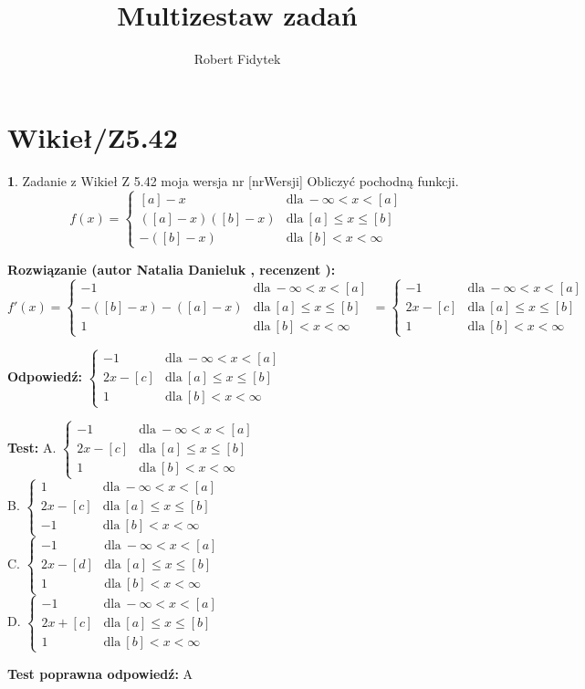 \documentclass[12pt, a4paper]{article}
\title{Multizestaw zadań}
\author{Robert Fidytek}
\date{}
\theoremstyle{definition} %
\newtheorem{zad}{}
\newcommand{\kategoria}[1]{\section{#1}} %
\newcommand{\zadStart}[1]{\begin{zad}#1\newline} %
\newcommand{\zadStop}{\end{zad}}   %
\newcommand{\rozwStart}[2]{\noindent \textbf{Rozwiązanie (autor #1 , recenzent #2): }\newline} %
\newcommand{\rozwStop}{\newline}                                            %
\newcommand{\odpStart}{\noindent \textbf{Odpowiedź:}\newline}    %
\newcommand{\odpStop}{\newline}                                             %
\newcommand{\testStart}{\noindent \textbf{Test:}\newline} %
\newcommand{\testStop}{\newline} %
\newcommand{\kluczStart}{\noindent \textbf{Test poprawna odpowiedź:}\newline} %
\newcommand{\kluczStop}{\newline} %
\begin{document}
\maketitle

\kategoria{Wikieł/Z5.42}

\zadStart{Zadanie z Wikieł Z 5.42 moja wersja nr [nrWersji]}
Obliczyć pochodną funkcji.
$$f(x) = 
\begin{cases} 
[a] - x & \text{dla} \ -\infty < x < [a] \\
([a] - x)([b] - x) & \text{dla} \ [a] \le x \le [b] \\
-([b] - x) & \text{dla} \ [b] < x < \infty
\end{cases} 
$$
\zadStop

\rozwStart{Natalia Danieluk}{}
$$f'(x) = 
\begin{cases} 
- 1 & \text{dla} \ -\infty < x < [a] \\
-([b] - x) - ([a] - x) & \text{dla} \ [a] \le x \le [b] \\
1 & \text{dla} \ [b] < x < \infty
\end{cases} 
=
\begin{cases} 
- 1 & \text{dla} \ -\infty < x < [a] \\
2x - [c] & \text{dla} \ [a] \le x \le [b] \\
1 & \text{dla} \ [b] < x < \infty
\end{cases} 
$$
\rozwStop

\odpStart
$
\begin{cases} 
- 1 & \text{dla} \ -\infty < x < [a] \\
2x - [c] & \text{dla} \ [a] \le x \le [b] \\
1 & \text{dla} \ [b] < x < \infty
\end{cases} 
$
\odpStop

\testStart
A. $
\begin{cases} 
- 1 & \text{dla} \ -\infty < x < [a] \\
2x - [c] & \text{dla} \ [a] \le x \le [b] \\
1 & \text{dla} \ [b] < x < \infty
\end{cases} 
$\\
B. $
\begin{cases} 
1 & \text{dla} \ -\infty < x < [a] \\
2x - [c] & \text{dla} \ [a] \le x \le [b] \\
-1 & \text{dla} \ [b] < x < \infty
\end{cases} 
$\\
C. $
\begin{cases} 
-1 & \text{dla} \ -\infty < x < [a] \\
2x - [d] & \text{dla} \ [a] \le x \le [b] \\
1 & \text{dla} \ [b] < x < \infty
\end{cases} 
$\\
D. $
\begin{cases} 
- 1 & \text{dla} \ -\infty < x < [a] \\
2x + [c] & \text{dla} \ [a] \le x \le [b] \\
1 & \text{dla} \ [b] < x < \infty
\end{cases} 
$
\testStop

\kluczStart
A
\kluczStop
\end{document}
